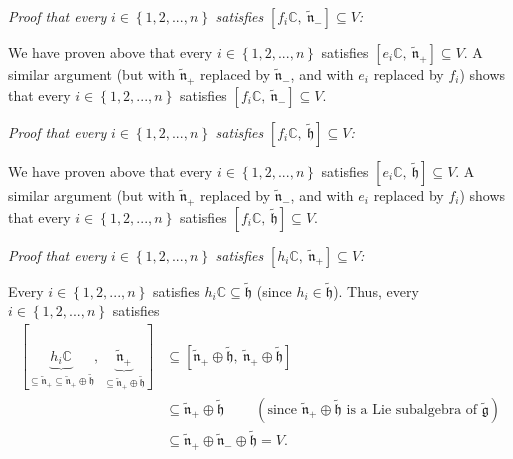 \documentclass[etingof-lie.tex]{subfiles}
\begin{document}
\textit{Proof that every }$i\in\left\{  1,2,...,n\right\}  $\textit{ satisfies
}$\left[  f_{i}\mathbb{C},\ \widetilde{\mathfrak{n}}_{-}\right]  \subseteq
V$\textit{:}

We have proven above that every $i\in\left\{  1,2,...,n\right\}  $ satisfies
$\left[  e_{i}\mathbb{C},\ \widetilde{\mathfrak{n}}_{+}\right]  \subseteq V$.
A similar argument (but with $\widetilde{\mathfrak{n}}_{+}$ replaced by
$\widetilde{\mathfrak{n}}_{-}$, and with $e_{i}$ replaced by $f_{i}$) shows
that every $i\in\left\{  1,2,...,n\right\}  $ satisfies $\left[
f_{i}\mathbb{C},\ \widetilde{\mathfrak{n}}_{-}\right]  \subseteq V$.

\textit{Proof that every }$i\in\left\{  1,2,...,n\right\}  $\textit{ satisfies
}$\left[  f_{i}\mathbb{C},\ \widetilde{\mathfrak{h}}\right]  \subseteq
V$\textit{:}

We have proven above that every $i\in\left\{  1,2,...,n\right\}  $ satisfies
$\left[  e_{i}\mathbb{C},\ \widetilde{\mathfrak{h}}\right]  \subseteq V$. A
similar argument (but with $\widetilde{\mathfrak{n}}_{+}$ replaced by
$\widetilde{\mathfrak{n}}_{-}$, and with $e_{i}$ replaced by $f_{i}$) shows
that every $i\in\left\{  1,2,...,n\right\}  $ satisfies $\left[
f_{i}\mathbb{C},\ \widetilde{\mathfrak{h}}\right]  \subseteq V$.

\textit{Proof that every }$i\in\left\{  1,2,...,n\right\}  $\textit{ satisfies
}$\left[  h_{i}\mathbb{C},\ \widetilde{\mathfrak{n}}_{+}\right]  \subseteq
V$\textit{:}

Every $i\in\left\{  1,2,...,n\right\}  $ satisfies $h_{i}\mathbb{C}%
\subseteq\widetilde{\mathfrak{h}}$ (since $h_{i}\in\widetilde{\mathfrak{h}}$).
Thus, every $i\in\left\{  1,2,...,n\right\}  $ satisfies%
\begin{align*}
\left[  \underbrace{h_{i}\mathbb{C}}_{\subseteq\widetilde{\mathfrak{n}}%
_{+}\subseteq\widetilde{\mathfrak{n}}_{+}\oplus\widetilde{\mathfrak{h}}%
},\ \underbrace{\widetilde{\mathfrak{n}}_{+}}_{\subseteq
\widetilde{\mathfrak{n}}_{+}\oplus\widetilde{\mathfrak{h}}}\right]   &
\subseteq\left[  \widetilde{\mathfrak{n}}_{+}\oplus\widetilde{\mathfrak{h}%
},\ \widetilde{\mathfrak{n}}_{+}\oplus\widetilde{\mathfrak{h}}\right] \\
&  \subseteq\widetilde{\mathfrak{n}}_{+}\oplus\widetilde{\mathfrak{h}%
}\ \ \ \ \ \ \ \ \ \ \left(  \text{since }\widetilde{\mathfrak{n}}_{+}%
\oplus\widetilde{\mathfrak{h}}\text{ is a Lie subalgebra of }%
\widetilde{\mathfrak{g}}\right) \\
&  \subseteq\widetilde{\mathfrak{n}}_{+}\oplus\widetilde{\mathfrak{n}}%
_{-}\oplus\widetilde{\mathfrak{h}}=V.
\end{align*}
\end{document}
